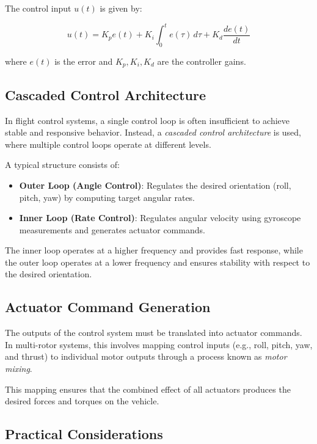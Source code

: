 The control input \( u(t) \) is given by:

\[
u(t) = K_p e(t) + K_i \int_{0}^{t} e(\tau)\,d\tau + K_d \frac{de(t)}{dt}
\]

where \( e(t) \) is the error and \( K_p, K_i, K_d \) are the controller gains.

\subsection{Cascaded Control Architecture}

In flight control systems, a single control loop is often insufficient to achieve stable and responsive behavior. Instead, a \textit{cascaded control architecture} is used, where multiple control loops operate at different levels.

A typical structure consists of:

\begin{itemize}
    \item \textbf{Outer Loop (Angle Control)}:  
    Regulates the desired orientation (roll, pitch, yaw) by computing target angular rates.

    \item \textbf{Inner Loop (Rate Control)}:  
    Regulates angular velocity using gyroscope measurements and generates actuator commands.
\end{itemize}

The inner loop operates at a higher frequency and provides fast response, while the outer loop operates at a lower frequency and ensures stability with respect to the desired orientation.

\subsection{Actuator Command Generation}

The outputs of the control system must be translated into actuator commands. In multi-rotor systems, this involves mapping control inputs (e.g., roll, pitch, yaw, and thrust) to individual motor outputs through a process known as \textit{motor mixing}.

This mapping ensures that the combined effect of all actuators produces the desired forces and torques on the vehicle.

\subsection{Practical Considerations}

